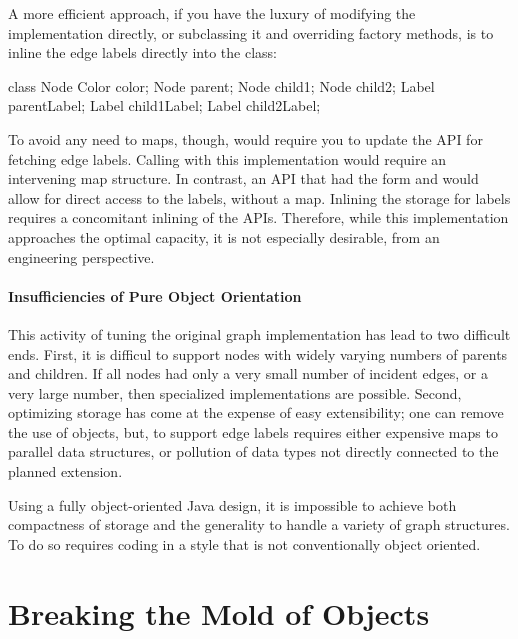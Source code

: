 A more efficient approach, if you have the luxury of modifying the 
implementation directly, or subclassing it and overriding factory methods, is to
inline the edge labels directly into the  class:
\begin{shortlisting}
class Node {
   Color color;
   Node parent;
   Node child1;
   Node child2;
   Label parentLabel;
   Label child1Label;
   Label child2Label;
}
\end{shortlisting} 
To avoid any need to maps, though, would require you to update the API for
fetching edge labels. Calling  with
this implementation would require an intervening map structure. In contrast,
an API that had the form  and
 would allow for direct access to the labels,
without a map. Inlining the storage for labels requires a concomitant inlining
of the APIs. Therefore, while this implementation
approaches the optimal capacity, it is not especially desirable, from an
engineering perspective.
 
\paragraph{Insufficiencies of Pure Object Orientation}
This activity of tuning the original graph implementation has lead to two
difficult ends. First, it is difficul to support nodes with widely
varying numbers of parents and children. If all nodes had only a very small number of incident
edges, or a very large number, then specialized implementations are possible.
Second, optimizing storage has come at the expense of easy extensibility; one
can remove the use of  objects, but, to support edge labels 
requires either expensive maps to parallel data structures, or 
pollution of data types not directly connected to the planned extension.

Using a fully object-oriented Java design, it is impossible to achieve both
compactness of storage and the generality to handle a variety of graph
structures. To do so requires coding in a style that is not conventionally object
oriented.







\section{Breaking the Mold of Objects}
\label{sec:fortran-style}

